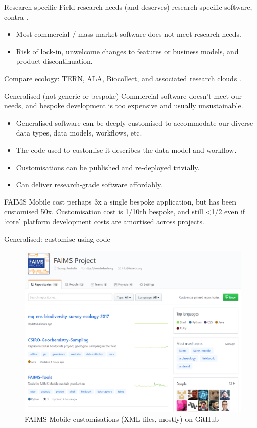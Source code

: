 \documentclass[aspectratio=169, 12pt]{beamer} %
\begin{document}
\begin{frame}{Research specific}
    Field research needs (and deserves) research-specific software, contra \cite{Roosevelt2015-kd}.
      \begin{itemize}[label=\textbullet]
        \item Most commercial / mass-market software does not meet research needs.
        \item Risk of lock-in, unwelcome changes to features or business models, and product discontinuation.
    \end{itemize}
    Compare ecology: TERN, ALA, Biocollect, and associated research clouds \cite{Tern2019-sp, Ala2019-by, Ala2019-cb}.
\end{frame}

\begin{frame}{Generalised (not generic or bespoke)}
  Commercial software doesn't meet our needs, and bespoke development is too expensive and usually unsustainable.
      \begin{itemize}[label=\textbullet]
        \item Generalised software can be deeply customised to accommodate our diverse data types, data models, workflows, etc.
        \item The code used to customise it describes the data model and workflow.
        \item Customisations can be published and re-deployed trivially.
        \item Can deliver research-grade software affordably.  
    \end{itemize}
    FAIMS Mobile cost perhaps 3x a single bespoke application, but has been customised 50x. Customisation cost is 1/10th bespoke, and still <1/2 even if `core' platform development costs are amortised across projects.
\end{frame}

\begin{frame}{Generalised: customise using code}
 \begin{figure}[H]
    \centering
        \includegraphics[height=.75\textheight]{figures/FAIMS-generalised.png}
        \caption{FAIMS Mobile customisations (XML files, mostly) on GitHub}
        \label{fig:figure11}
 \end{figure}
\end{frame}
\end{document}
